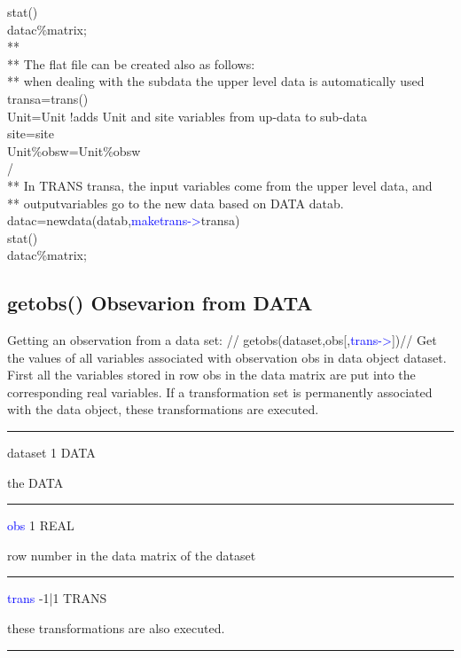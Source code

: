 \begin{example}[linkdataex]
\textcolor{VioletRed}{stat}()\\
datac\%matrix;\\
**\\
** The flat file can be created also as follows:\\
** when dealing with the subdata the upper level data is automatically used\\
transa=\textcolor{VioletRed}{trans}()\\
Unit=Unit !adds Unit and site variables from up-data to sub-data\\
site=site\\
Unit\%obsw=Unit\%obsw\\
/\\
** In TRANS transa, the input variables come from the upper level data, and\\
** outputvariables go to the new data based on DATA datab.\\
datac=\textcolor{VioletRed}{newdata}(datab,\textcolor{blue}{maketrans->}transa)\\
\textcolor{VioletRed}{stat}()\\
datac\%matrix;
\end{example}
\subsection{\textcolor{VioletRed}{getobs}() Obsevarion from  DATA}
\label{getobs}
Getting an observation from a data set: //
\textcolor{VioletRed}{getobs}(dataset,obs[,\textcolor{blue}{trans->}])//
Get the values of all variables associated with observation obs in data object dataset. First all the
variables stored in row obs in the data matrix are put into the corresponding real variables. If
a transformation set is permanently associated with the data object, these transformations are
executed.
\vspace{0.3cm}
\hrule
\vspace{0.3cm}
\noindent dataset \tabto{3cm} 1 \tabto{5cm}  DATA  \tabto{7cm}
\begin{changemargin}{3cm}{0cm}
\noindent  the DATA
\end{changemargin}
\vspace{0.3cm}
\hrule
\vspace{0.3cm}
\noindent \textcolor{blue}{obs}  \tabto{3cm} 1 \tabto{5cm}   REAL \tabto{7cm}
\begin{changemargin}{3cm}{0cm}
\noindent  row number in the data matrix of the dataset
\end{changemargin}
\vspace{0.3cm}
\hrule
\vspace{0.3cm}
\noindent \textcolor{blue}{trans} \tabto{3cm} -1|1  \tabto{5cm}   TRANS  \tabto{7cm}
\begin{changemargin}{3cm}{0cm}
\noindent  these transformations are also executed.
\end {changemargin}
\hrule
\vspace{0.2cm}
